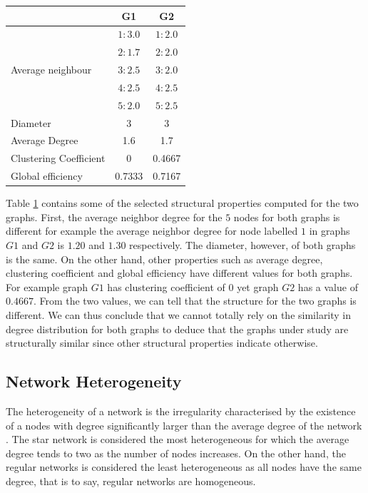 \documentclass[10pt,a4paper]{article}
\theoremstyle{plain}
\theoremstyle{definition}
\begin{document}
\begin{table}[H]
	\centering
	\renewcommand{\arraystretch}{1.2}
	\begin{tabular}{|l|c|c|}
		\hline
		&G1 & G2 \\
		\hline
		\multirow{5}{*}{Average neighbour} & $1:3.0$ & $1: 2.0$\\
		& $2: 1.7$ & $2:2.0$\\
		& $3: 2.5$ & $3:2.0 $ \\
		& $4: 2.5$ & $4:2.5 $ \\ 
		& $5: 2.0$ & $5:2.5 $ \\
		\hline
		Diameter & 3 & 3 \\
		\hline
		Average Degree & 1.6 & 1.7 \\
		\hline
		Clustering Coefficient & 0 &0.4667 \\
		\hline
		Global efficiency & 0.7333 & 0.7167 \\
		\hline
	\end{tabular} 
    \label{table-properties}
\end{table}

Table \ref{table-properties} contains some of the selected structural properties computed for the two graphs. First, the average neighbor degree for the $5$ nodes for both graphs is different for example the average neighbor degree for node labelled $1$ in graphs $G1$ and $G2$ is  $1.20$ and $1.30$ respectively. The diameter, however, of both graphs is the same. On the other hand, other properties such as average degree, clustering coefficient and global efficiency have different values for both graphs. For example graph $G1$ has clustering coefficient of $0$ yet graph $G2$  has a value of $0.4667$. From the two values, we can tell that the structure for the two graphs is different.
We can thus conclude that we cannot totally rely on the similarity in degree distribution for both graphs to deduce that the graphs under study are structurally similar since other structural properties indicate otherwise.

\subsection{Network Heterogeneity}
The heterogeneity of a network is the irregularity characterised by the existence of a nodes with degree significantly larger than the average degree of the network \citep{estrada2010quantifying,albert2002statistical,newman2003structure}. The star network is considered the most heterogeneous for which the average degree tends to two as the number of nodes increases. On the other hand, the regular networks is considered the least heterogeneous as all nodes have the same degree, that is to say, regular networks are homogeneous. 
\end{document}

